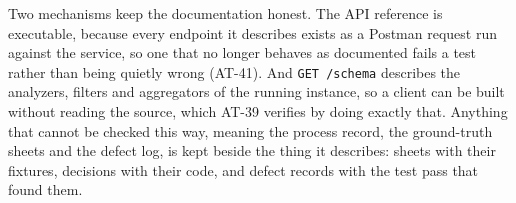 \documentclass[11pt,a4paper]{article}
\begin{document}
Two mechanisms keep the documentation honest. The API reference is executable,
because every endpoint it describes exists as a Postman request run against the
service, so one that no longer behaves as documented fails a test rather than
being quietly wrong (AT-41). And \texttt{GET /schema} describes the analyzers,
filters and aggregators of the running instance, so a client can be built
without reading the source, which AT-39 verifies by doing exactly that. Anything
that cannot be checked this way, meaning the process record, the ground-truth
sheets and the defect log, is kept beside the thing it describes: sheets with
their fixtures, decisions with their code, and defect records with the test pass
that found them.
\end{document}
